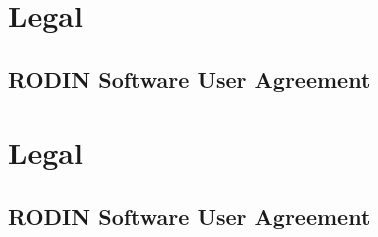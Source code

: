 \section{Legal}
\label{sec:legal}

\subsection{RODIN Software User Agreement}
\label{sec:user-agreement}


\else
  \section{Legal}
  \label{sec:legal}

  \subsection{RODIN Software User Agreement}
  \label{sec:user-agreement}

  
\endif

